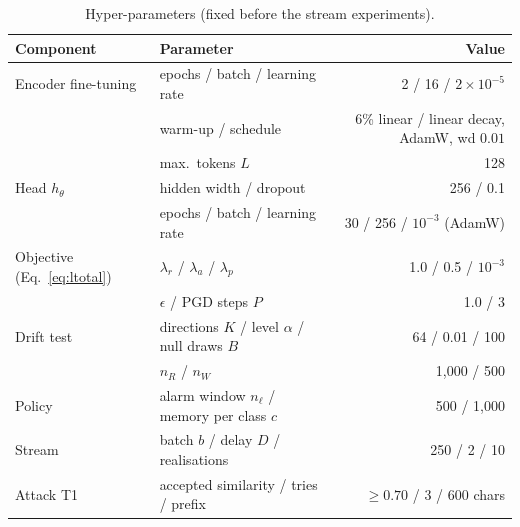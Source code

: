 \begin{table}[t]
\centering
\caption{Hyper-parameters (fixed before the stream experiments).}
\label{tab:hyper}
\scriptsize
\begin{tabular}{@{}llr@{}}
\toprule
Component & Parameter & Value \\
\midrule
Encoder fine-tuning & epochs / batch / learning rate & 2 / 16 / $2\times10^{-5}$ \\
 & warm-up / schedule & 6\% linear / linear decay, AdamW, wd $0.01$ \\
 & max.\ tokens $L$ & 128 \\
Head $h_\theta$ & hidden width / dropout & 256 / 0.1 \\
 & epochs / batch / learning rate & 30 / 256 / $10^{-3}$ (AdamW) \\
Objective (Eq.~\ref{eq:ltotal}) & $\lambda_r$ / $\lambda_a$ / $\lambda_p$ & 1.0 / 0.5 / $10^{-3}$ \\
 & $\epsilon$ / PGD steps $P$ & 1.0 / 3 \\
Drift test & directions $K$ / level $\alpha$ / null draws $B$ & 64 / 0.01 / 100 \\
 & $n_R$ / $n_W$ & 1{,}000 / 500 \\
Policy & alarm window $n_\ell$ / memory per class $c$ & 500 / 1{,}000 \\
Stream & batch $b$ / delay $D$ / realisations & 250 / 2 / 10 \\
Attack T1 & accepted similarity / tries / prefix & $\ge 0.70$ / 3 / 600 chars \\
\bottomrule
\end{tabular}
\end{table}
